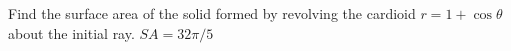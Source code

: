 {Find the surface area of the solid formed by revolving the cardioid $r=1+\cos\theta$ about the initial ray.
}
{$SA = 32\pi/5$
}
